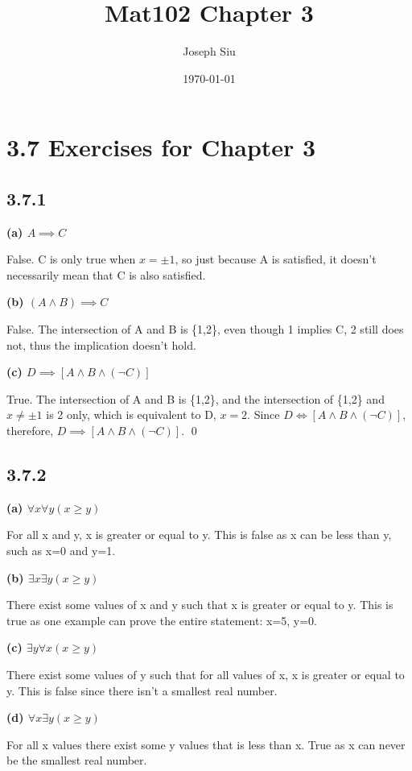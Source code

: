 \documentclass{article}
\title{Mat102 Chapter 3}
\author{Joseph Siu}
\date{\today}
\begin{document}
\maketitle

\section*{3.7 Exercises for Chapter 3}
\subsection*{3.7.1}
\textbf{(a) $A \implies C$}

False. C is only true when $x = \pm 1$, so just because A is satisfied, it doesn't necessarily mean that C is also satisfied.

\textbf{(b) $(A \land B) \implies C$}

False. The intersection of A and B is \{1,2\}, even though 1 implies C, 2 still does not, thus the implication doesn't hold.

\textbf{(c) $D \implies [A \land B \land (\neg C)]$}

True. The intersection of A and B is \{1,2\}, and the intersection of \{1,2\} and $x \neq \pm 1$ is 2 only, which is equivalent to D, $x=2$. Since $D \iff [A \land B \land (\neg C)]$, therefore, $D \implies [A \land B \land (\neg C)]$. \qed

\subsection*{3.7.2}
\textbf{(a) $\forall x \forall y (x \geq y)$}

For all x and y, x is greater or equal to y. This is false as x can be less than y, such as x=0 and y=1.

\textbf{(b) $\exists x \exists y (x \geq y)$}

There exist some values of x and y such that x is greater or equal to y. This is true as one example can prove the entire statement: x=5, y=0.

\textbf{(c) $\exists y \forall x (x \geq y)$}

There exist some values of y such that for all values of x, x is greater or equal to y. This is false since there isn't a smallest real number.

\textbf{(d) $\forall x \exists y (x \geq y)$}

For all x values there exist some y values that is less than x. True as x can never be the smallest real number.
\end{document}
